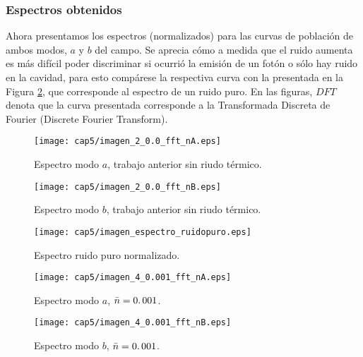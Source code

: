 \subsubsection{Espectros obtenidos}
\qquad Ahora presentamos los espectros (normalizados) para las curvas de poblaci\'on de ambos modos, $a$ y $b$ del campo. Se aprecia c\'omo a medida que el ruido aumenta es m\'as dif\'icil poder discriminar si ocurri\'o la emisi\'on de un fot\'on o s\'olo hay ruido en la cavidad, para esto comp\'arese la respectiva curva con la presentada en la Figura \ref{fig:espectro_ruidopuro}, que corresponde al espectro de un ruido puro. En las figuras, $DFT$ denota que la curva presentada corresponde a la Transformada Discreta de Fourier (Discrete Fourier Transform).
\begin{figure}[ht]
\hspace*{-1.6cm}
\begin{minipage}{0.52 \linewidth}
\centering
 \texttt{[image: cap5/imagen\_2\_0.0\_fft\_nA.eps]}
\caption{Espectro modo $a$, trabajo anterior sin riudo t\'ermico.}\label{fig:espectro_2_0}
\end{minipage}
\hspace*{1.5cm}
\begin{minipage}{0.52 \linewidth}
\centering
 \texttt{[image: cap5/imagen\_2\_0.0\_fft\_nB.eps]}
\caption{Espectro modo $b$, trabajo anterior sin riudo t\'ermico.}\label{fig:espectro_2_0}
\end{minipage}
\end{figure}
\begin{figure}[ht]
\centering
\begin{minipage}{0.52 \linewidth}
\centering
 \texttt{[image: cap5/imagen\_espectro\_ruidopuro.eps]}
\caption{Espectro ruido puro normalizado.}\label{fig:espectro_ruidopuro}
\end{minipage}
\end{figure}
\begin{figure}[ht]
\hspace*{-1.6cm}
\begin{minipage}{0.52 \linewidth}
\centering
 \texttt{[image: cap5/imagen\_4\_0.001\_fft\_nA.eps]}
\caption{Espectro modo $a$, $\bar{n}=0\ldotp 001$.}\label{fig:espectro_4_0001}
\end{minipage}
\hspace*{1.5cm}
\begin{minipage}{0.52 \linewidth}
\centering
 \texttt{[image: cap5/imagen\_4\_0.001\_fft\_nB.eps]}
\caption{Espectro modo $b$, $\bar{n}=0\ldotp 001$.}\label{fig:espectro_4_0001}
\end{minipage}
\end{figure}
